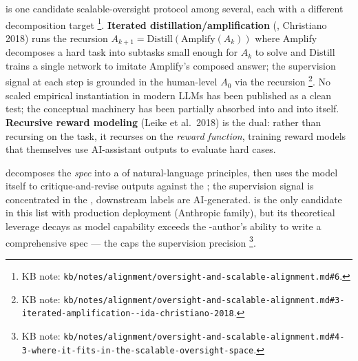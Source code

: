  is one candidate scalable-oversight protocol among several,
each with a different decomposition target%
\footnote{KB note: \nolinkurl{kb/notes/alignment/oversight-and-scalable-alignment.md#6}.}.
\textbf{Iterated distillation/amplification} (, Christiano 2018)
 runs the
recursion $A_{k+1} = \mathrm{Distill}(\mathrm{Amplify}(A_k))$ where
Amplify decomposes a hard task into subtasks small enough for $A_k$
to solve and Distill trains a single network to imitate Amplify's
composed answer; the supervision signal at each step is grounded in
the human-level $A_0$ via the recursion%
\footnote{KB note: \nolinkurl{kb/notes/alignment/oversight-and-scalable-alignment.md#3-iterated-amplification--ida-christiano-2018}.}.
No scaled empirical instantiation in modern LLMs has been published
as a clean test; the conceptual machinery has been partially absorbed
into  and into  itself. \textbf{Recursive reward modeling}
(Leike et al.\ 2018)  is the dual: rather than recursing on the task, it
recurses on the \emph{reward function}, training reward models that
themselves use AI-assistant outputs to evaluate hard cases.

\textbf{} \citep{bai2022-cai} decomposes the
\emph{ spec} into a  of natural-language principles,
then uses the model itself to critique-and-revise outputs against the
; the supervision signal is concentrated in the
, downstream labels are AI-generated.  is the only
candidate in this list with production deployment (Anthropic 
family), but its theoretical leverage decays as model capability
exceeds the -author's ability to write a comprehensive
spec --- the  caps the supervision precision%
\footnote{KB note: \nolinkurl{kb/notes/alignment/oversight-and-scalable-alignment.md#4-3-where-it-fits-in-the-scalable-oversight-space}.}.

